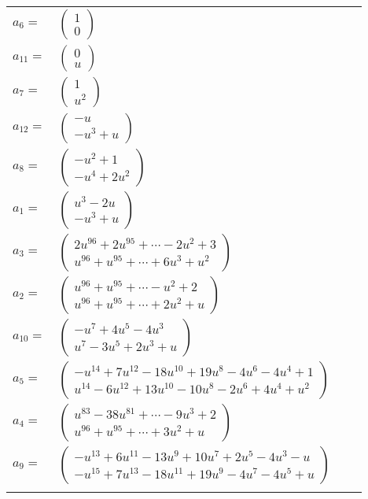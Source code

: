 \documentclass[1p]{elsarticle_modified}
\theoremstyle{definition}
\begin{document}
\begin{tabular}{m{7pt} m{180pt} m{7pt} m{180pt} }
\flushright $a_{6}=$&$\begin{pmatrix}1\\0\end{pmatrix}$ \\
\flushright $a_{11}=$&$\begin{pmatrix}0\\u\end{pmatrix}$ \\
\flushright $a_{7}=$&$\begin{pmatrix}1\\u^2\end{pmatrix}$ \\
\flushright $a_{12}=$&$\begin{pmatrix}- u\\- u^3+u\end{pmatrix}$ \\
\flushright $a_{8}=$&$\begin{pmatrix}- u^2+1\\- u^4+2 u^2\end{pmatrix}$ \\
\flushright $a_{1}=$&$\begin{pmatrix}u^3-2 u\\- u^3+u\end{pmatrix}$ \\
\flushright $a_{3}=$&$\begin{pmatrix}2 u^{96}+2 u^{95}+\cdots-2 u^2+3\\u^{96}+u^{95}+\cdots+6 u^3+u^2\end{pmatrix}$ \\
\flushright $a_{2}=$&$\begin{pmatrix}u^{96}+u^{95}+\cdots- u^2+2\\u^{96}+u^{95}+\cdots+2 u^2+u\end{pmatrix}$ \\
\flushright $a_{10}=$&$\begin{pmatrix}- u^7+4 u^5-4 u^3\\u^7-3 u^5+2 u^3+u\end{pmatrix}$ \\
\flushright $a_{5}=$&$\begin{pmatrix}- u^{14}+7 u^{12}-18 u^{10}+19 u^8-4 u^6-4 u^4+1\\u^{14}-6 u^{12}+13 u^{10}-10 u^8-2 u^6+4 u^4+u^2\end{pmatrix}$ \\
\flushright $a_{4}=$&$\begin{pmatrix}u^{83}-38 u^{81}+\cdots-9 u^3+2\\u^{96}+u^{95}+\cdots+3 u^2+u\end{pmatrix}$ \\
\flushright $a_{9}=$&$\begin{pmatrix}- u^{13}+6 u^{11}-13 u^9+10 u^7+2 u^5-4 u^3- u\\- u^{15}+7 u^{13}-18 u^{11}+19 u^9-4 u^7-4 u^5+u\end{pmatrix}$\\&\end{tabular}
\end{document}
